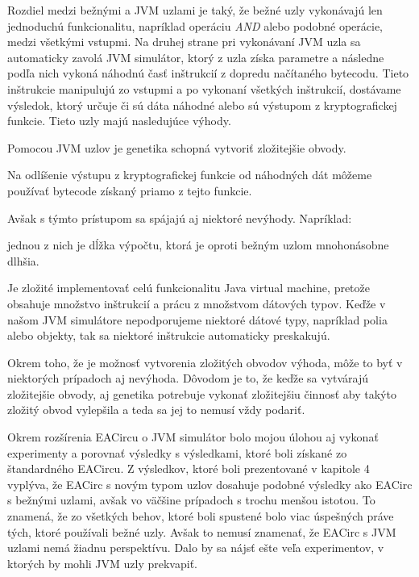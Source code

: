 Rozdiel medzi bežnými a JVM uzlami je taký, že bežné uzly vykonávajú len jednoduchú funkcionalitu, napríklad operáciu \textit{AND} alebo podobné operácie, medzi všetkými vstupmi. Na druhej strane pri vykonávaní JVM uzla sa automaticky zavolá JVM simulátor, ktorý z uzla získa parametre a následne podľa nich vykoná náhodnú časť inštrukcií z dopredu načítaného bytecodu. Tieto inštrukcie manipulujú zo vstupmi a po vykonaní všetkých inštrukcií, dostávame výsledok, ktorý určuje či sú dáta náhodné alebo sú výstupom z kryptografickej funkcie. Tieto uzly majú nasledujúce výhody.
\begin{myItemize}
	\item Pomocou JVM uzlov je genetika schopná vytvoriť zložitejšie obvody.
	\item Na odlíšenie výstupu z kryptografickej funkcie od náhodných dát môžeme používať bytecode získaný priamo z tejto funkcie.
\end{myItemize}
Avšak s týmto prístupom sa spájajú aj niektoré nevýhody. Napríklad:
\begin{myItemize}
	\item jednou z nich je dĺžka výpočtu, ktorá je oproti bežným uzlom mnohonásobne dlhšia. 
	\item Je zložité implementovať celú funkcionalitu Java virtual machine, pretože obsahuje množstvo inštrukcií a prácu z množstvom dátových typov. Keďže v našom JVM simulátore nepodporujeme niektoré dátové typy, napríklad polia alebo objekty, tak sa niektoré inštrukcie automaticky preskakujú.
	\item Okrem toho, že je možnosť vytvorenia zložitých obvodov výhoda, môže to byť v niektorých prípadoch aj nevýhoda. Dôvodom je to, že keďže sa vytvárajú zložitejšie obvody, aj genetika potrebuje vykonať zložitejšiu činnosť aby takýto zložitý obvod vylepšila a teda sa jej to nemusí vždy podariť. 
\end{myItemize}

Okrem rozšírenia EACircu o JVM simulátor bolo mojou úlohou aj vykonať experimenty a porovnať výsledky s výsledkami, ktoré boli získané zo štandardného EACircu. Z výsledkov, ktoré boli prezentované v kapitole 4 vyplýva, že EACirc s novým typom uzlov dosahuje podobné výsledky ako EACirc s bežnými uzlami, avšak vo väčšine prípadoch s trochu menšou istotou. To znamená, že zo všetkých behov, ktoré boli spustené bolo viac úspešných práve tých, ktoré používali bežné uzly. Avšak to nemusí znamenať, že EACirc s JVM uzlami nemá žiadnu perspektívu. Dalo by sa nájsť ešte veľa experimentov, v ktorých by mohli JVM uzly prekvapiť.


